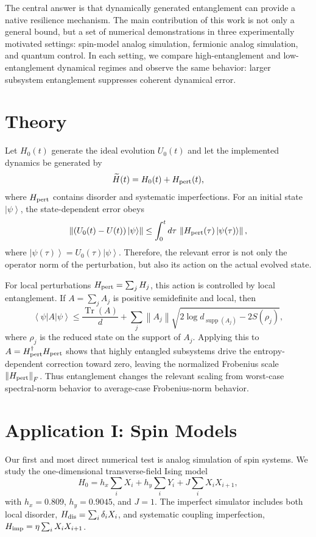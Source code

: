 \documentclass[a4paper]{article}
\newcommand{\ket}[1]{\left|#1\right\rangle}
\newcommand{\bra}[1]{\left\langle #1\right|}
\newcommand{\norm}[1]{\left\lVert #1\right\rVert}
\newcommand{\Tr}{\operatorname{Tr}}
\DeclareMathOperator{\support}{supp}
\begin{document}
The central answer is that dynamically generated entanglement can provide a
native resilience mechanism. The main contribution of this work is not only a
general bound, but a set of numerical demonstrations in three experimentally
motivated settings: spin-model analog simulation, fermionic analog simulation,
and quantum control. In each setting, we compare high-entanglement and
low-entanglement dynamical regimes and observe the same behavior: larger
subsystem entanglement suppresses coherent dynamical error.

\section{Theory}

Let $H_0(t)$ generate the ideal evolution $U_0(t)$ and let the implemented
dynamics be generated by
\[
  \widetilde{H}(t)=H_0(t)+H_{\rm pert}(t),
\]
where $H_{\rm pert}$ contains disorder and systematic imperfections. For an
initial state $\ket{\psi}$, the state-dependent error obeys
\begin{equation}
 \norm{(U_0(t)-U(t))\ket{\psi}}
 \leq \int_0^t d\tau\,
 \norm{H_{\rm pert}(\tau)\ket{\psi(\tau)}} ,
\label{eq:basic-bound}
\end{equation}
where $\ket{\psi(\tau)}=U_0(\tau)\ket{\psi}$. Therefore, the relevant error is
not only the operator norm of the perturbation, but also its action on the
actual evolved state.

For local perturbations $H_{\rm pert}=\sum_jH_j$, this action is controlled by
local entanglement. If $A=\sum_jA_j$ is positive semidefinite and local, then
\begin{equation}
 \bra{\psi}A\ket{\psi}
 \leq \frac{\Tr(A)}{d}
 +\sum_j\norm{A_j}
 \sqrt{2\log d_{\support(A_j)}-2S(\rho_j)} ,
\label{eq:entropy-bound}
\end{equation}
where $\rho_j$ is the reduced state on the support of $A_j$. Applying this to
$A=H_{\rm pert}^{\dagger}H_{\rm pert}$ shows that highly entangled subsystems
drive the entropy-dependent correction toward zero, leaving the normalized
Frobenius scale $\norm{H_{\rm pert}}_F$. Thus entanglement changes the relevant
scaling from worst-case spectral-norm behavior to average-case
Frobenius-norm behavior.

\section{Application I: Spin Models}

Our first and most direct numerical test is analog simulation of spin systems.
We study the one-dimensional transverse-field Ising model
\[
 H_0=h_x\sum_i X_i+h_y\sum_iY_i+J\sum_iX_iX_{i+1},
\]
with $h_x=0.809$, $h_y=0.9045$, and $J=1$. The imperfect simulator includes
both local disorder, $H_{\rm dis}=\sum_i\delta_iX_i$, and systematic coupling
imperfection, $H_{\rm imp}=\eta\sum_iX_iX_{i+1}$.
\end{document}
